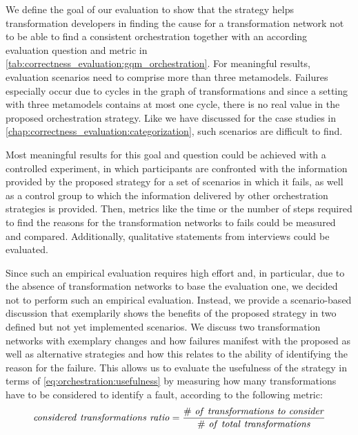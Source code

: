 We define the goal of our evaluation to show that the strategy helps transformation developers in finding the cause for a transformation network not to be able to find a consistent orchestration together with an according evaluation question and metric in \autoref{tab:correctness_evaluation:gqm_orchestration}.
For meaningful results, evaluation scenarios need to comprise more than three metamodels.
Failures especially occur due to cycles in the graph of transformations and since a setting with three metamodels contains at most one cycle, there is no real value in the proposed orchestration strategy.
Like we have discussed for the case studies in \autoref{chap:correctness_evaluation:categorization}, such scenarios are difficult to find.

Most meaningful results for this goal and question could be achieved with a controlled experiment, in which participants are confronted with the information provided by the proposed strategy for a set of scenarios in which it fails, as well as a control group to which the information delivered by other orchestration strategies is provided.
Then, metrics like the time or the number of steps required to find the reasons for the transformation networks to fails could be measured and compared.
Additionally, qualitative statements from interviews could be evaluated.

Since such an empirical evaluation requires high effort and, in particular, due to the absence of transformation networks to base the evaluation one, we decided not to perform such an empirical evaluation.
Instead, we provide a scenario-based discussion that exemplarily shows the benefits of the proposed strategy in two defined but not yet implemented scenarios.
We discuss two transformation networks with exemplary changes and how failures manifest with the proposed as well as alternative strategies and how this relates to the ability of identifying the reason for the failure.
This allows us to evaluate the usefulness of the strategy in terms of \autoref{eq:orchestration:usefulness} by measuring how many transformations have to be considered to identify a fault, according to the following metric:
\begin{align*}
    \mathvariable{considered\ transformations\ ratio = \frac{\#\ of\ transformations\ to\ consider%
    }{\#\ of\ total\ transformations}}
\end{align*}


